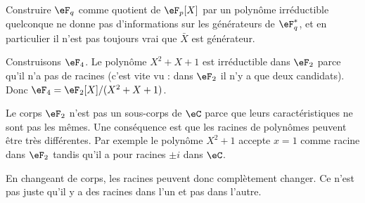 Construire \( \eF_q\) comme quotient de \( \eF_p[X]\) par un polynôme irréductible quelconque ne donne pas d'informations sur les générateurs de \( \eF_q^*\), et en particulier il n'est pas toujours vrai que \( \bar X\) est générateur.

\begin{example}
    Construisons \( \eF_4\). Le polynôme \( X^2+X+1\) est irréductible dans \( \eF_2\) parce qu'il n'a pas de racines (c'est vite vu : dans \( \eF_2\) il n'y a que deux candidats). Donc \( \eF_4=\eF_2[X]/(X^2+X+1)\).
\end{example}

\begin{remark}
    Le corps \( \eF_2\) n'est pas un sous-corps de \( \eC\) parce que leurs caractéristiques ne sont pas les mêmes. Une conséquence est que les racines de polynômes peuvent être très différentes. Par exemple le polynôme \( X^2+1\) accepte \( x=1\) comme racine dans \( \eF_2\) tandis qu'il a pour racines \( \pm i\) dans \( \eC\).

    En changeant de corps, les racines peuvent donc complètement changer. Ce n'est pas juste qu'il y a des racines dans l'un et pas dans l'autre.
\end{remark}

